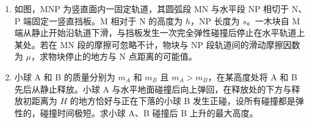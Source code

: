 \documentclass[\gkver]{gaokaozhenti}
\begin{document}
\begin{enumerate}
{⑥温度为 $T_{1}$ 时热敏电阻的电阻值 $R_{T}=R_{0}-R_{1}+150\UO$。

⑦逐步降低 $T_{1}$ 的数值，直至 $20\UdC$ 为止；在每一温度下重复步骤⑤⑥即可。
}

\item
如图，MNP 为竖直面内一固定轨道，其圆弧段 MN 与水平段 NP 相切于 N、P 端固定一竖直挡板。M 相对于 N 的高度为 $h$，NP 长度为 $s$。一木块自 M 端从静止开始沿轨道下滑，与挡板发生一次完全弹性碰撞后停止在水平轨道上某处。若在 MN 段的摩擦可忽略不计，物块与 NP 段轨道间的滑动摩擦因数为 $\mu$，求物块停止的地方与 N 点距离的可能值。

\item
小球 A 和 B 的质量分别为 $m_{A}$ 和 $m_{B}$ 且 $m_{A}>m_{B}$，在某高度处将 A 和 B 先后从静止释放。小球 A 与水平地面碰撞后向上弹回，在释放处的下方与释放初距离为 $H$ 的地方恰好与正在下落的小球 B 发生正碰，设所有碰撞都是弹性的，碰撞时间极短。求小球 A、B 碰撞后 B 上升的最大高度。
\end{enumerate}
\end{document}
